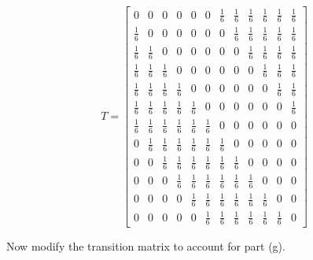 \documentclass[fleqn]{article}
\begin{document}
\begin{enumerate}[nolistsep]
\begin{enumerate}
			\begin{equation*}
				T = \begin{bmatrix}
					0 & 0 & 0 & 0 & 0 & 0 & \frac{1}{6} & \frac{1}{6} & \frac{1}{6} & \frac{1}{6} & \frac{1}{6} & \frac{1}{6}\\[3pt]
					\frac{1}{6} & 0 & 0 & 0 & 0 & 0 & 0 & \frac{1}{6} & \frac{1}{6} & \frac{1}{6} & \frac{1}{6} & \frac{1}{6}\\[3pt]
					\frac{1}{6} & \frac{1}{6} & 0 & 0 & 0 & 0 & 0 & 0 & \frac{1}{6} & \frac{1}{6} & \frac{1}{6} & \frac{1}{6}\\[3pt]
					\frac{1}{6} & \frac{1}{6} & \frac{1}{6} & 0 & 0 & 0 & 0 & 0 & 0 & \frac{1}{6} & \frac{1}{6} & \frac{1}{6}\\[3pt]
					\frac{1}{6} & \frac{1}{6} & \frac{1}{6} & \frac{1}{6} & 0 & 0 & 0 & 0 & 0 & 0 & \frac{1}{6} & \frac{1}{6}\\[3pt]
					\frac{1}{6} & \frac{1}{6} & \frac{1}{6} & \frac{1}{6} & \frac{1}{6} & 0 & 0 & 0 & 0 & 0 & 0 & \frac{1}{6}\\[3pt]
					\frac{1}{6} & \frac{1}{6} & \frac{1}{6} & \frac{1}{6} & \frac{1}{6} & \frac{1}{6} & 0 & 0 & 0 & 0 & 0 & 0\\[3pt]
					0 & \frac{1}{6} & \frac{1}{6} & \frac{1}{6} & \frac{1}{6} & \frac{1}{6} & \frac{1}{6} & 0 & 0 & 0 & 0 & 0\\[3pt]
					0 & 0 & \frac{1}{6} & \frac{1}{6} & \frac{1}{6} & \frac{1}{6} & \frac{1}{6} & \frac{1}{6} & 0 & 0 & 0 & 0\\[3pt]
					0 & 0 & 0 & \frac{1}{6} & \frac{1}{6} & \frac{1}{6} & \frac{1}{6} & \frac{1}{6} & \frac{1}{6} & 0 & 0 & 0\\[3pt]
					0 & 0 & 0 & 0 & \frac{1}{6} & \frac{1}{6} & \frac{1}{6} & \frac{1}{6} & \frac{1}{6} & \frac{1}{6} & 0 & 0\\[3pt]
					0 & 0 & 0 & 0 & 0 & \frac{1}{6} & \frac{1}{6} & \frac{1}{6} & \frac{1}{6} & \frac{1}{6} & \frac{1}{6} & 0
				\end{bmatrix}
			\end{equation*}
			
			Now modify the transition matrix to account for part (g).
			

\end{enumerate}
\end{enumerate}
\end{document}

